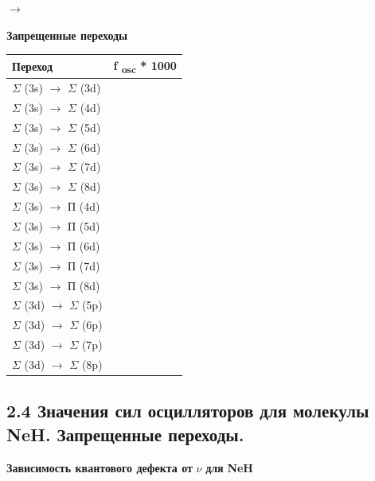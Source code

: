 \foreignlanguage{english}{$\rightarrow $}

{\centering
\textbf{Запрещенные
переходы}
\par}

\begin{flushleft}
\tablefirsthead{}
\tablehead{}
\tabletail{}
\tablelasttail{}
\begin{supertabular}{|m{6.577cm}|m{6.801cm}|}
\hline
\textbf{{Переход}} &
\textbf{{f }}\textbf{{\textsubscript{osc}}}\textbf{{ * 1000}}\\\hline
{$\Sigma $ (3s) $\rightarrow $ $\Sigma $ (3d)} &
\raggedleft{}\\
{$\Sigma $ (3s) $\rightarrow $ $\Sigma $ (4d)} &
\raggedleft{}\\
{$\Sigma $ (3s) $\rightarrow $ $\Sigma $ (5d)} &
\raggedleft{}\\
{$\Sigma $ (3s) $\rightarrow $ $\Sigma $ (6d)} &
\raggedleft{}\\
{$\Sigma $ (3s) $\rightarrow $ $\Sigma $ (7d)} &
\raggedleft{}\\
{$\Sigma $ (3s) $\rightarrow $ $\Sigma $ (8d)} &
\raggedleft{}\\\hline
{$\Sigma $ (3s) $\rightarrow $ П (4d)} &
\raggedleft{}\\
{$\Sigma $ (3s) $\rightarrow $ П (5d)} &
\raggedleft{}\\
{$\Sigma $ (3s) $\rightarrow $ П (6d)} &
\raggedleft{}\\
{$\Sigma $ (3s) $\rightarrow $ П (7d)} &
\raggedleft{}\\
{$\Sigma $ (3s) $\rightarrow $ П (8d)} &
\raggedleft{}\\\hline
{$\Sigma $ (3d) $\rightarrow $ $\Sigma $ (5p)} &
\raggedleft{}\\
{$\Sigma $ (3d) $\rightarrow $ $\Sigma $ (6p)} &
\raggedleft{}\\
{$\Sigma $ (3d) $\rightarrow $ $\Sigma $ (7p)} &
\raggedleft{}\\
{$\Sigma $ (3d) $\rightarrow $ $\Sigma $ (8p)} &
\raggedleft{}\\\hline
\end{supertabular}
\end{flushleft}
\subsection[2.4 Значения сил
осцилляторов для молекулы NeH. Запрещенные
переходы.]{2.4
Значения сил осцилляторов для
молекулы \foreignlanguage{english}{NeH}.
Запрещенные
переходы.}
{\centering
\textbf{Зависимость
квантового
дефекта от }\foreignlanguage{english}{\textbf{$\nu $}}\textbf{
для }\foreignlanguage{english}{\textbf{NeH}}\textbf{ }
\par}

